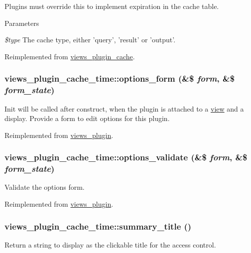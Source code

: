 Plugins must override this to implement expiration in the cache table.


\begin{DoxyParams}{Parameters}
\item[{\em \$type}]The cache type, either 'query', 'result' or 'output'. \end{DoxyParams}


Reimplemented from \hyperlink{classviews__plugin__cache_a1b96b0d016d91c5885592d3eaf1c8fca}{views\_\-plugin\_\-cache}.\hypertarget{classviews__plugin__cache__time_ac12d2ba054e232ae1d425d189a2d78d9}{
\subsubsection[{options\_\-form}]{\setlength{\rightskip}{0pt plus 5cm}views\_\-plugin\_\-cache\_\-time::options\_\-form (\&\$ {\em form}, \/  \&\$ {\em form\_\-state})}}
\label{classviews__plugin__cache__time_ac12d2ba054e232ae1d425d189a2d78d9}
Init will be called after construct, when the plugin is attached to a \hyperlink{classview}{view} and a display. Provide a form to edit options for this plugin. 

Reimplemented from \hyperlink{classviews__plugin_a1aaed8da1afd9f45293a37358c159837}{views\_\-plugin}.\hypertarget{classviews__plugin__cache__time_a095bb0d313db8eef7521928923a6f261}{
\subsubsection[{options\_\-validate}]{\setlength{\rightskip}{0pt plus 5cm}views\_\-plugin\_\-cache\_\-time::options\_\-validate (\&\$ {\em form}, \/  \&\$ {\em form\_\-state})}}
\label{classviews__plugin__cache__time_a095bb0d313db8eef7521928923a6f261}
Validate the options form. 

Reimplemented from \hyperlink{classviews__plugin_a46d72eb35feea36fed83cd1355a47431}{views\_\-plugin}.\hypertarget{classviews__plugin__cache__time_ac8eaac0cd0c620c7583dbbe0481ca62c}{
\subsubsection[{summary\_\-title}]{\setlength{\rightskip}{0pt plus 5cm}views\_\-plugin\_\-cache\_\-time::summary\_\-title ()}}
\label{classviews__plugin__cache__time_ac8eaac0cd0c620c7583dbbe0481ca62c}
Return a string to display as the clickable title for the access control. 

